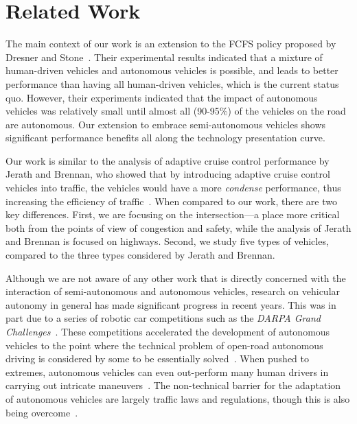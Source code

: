 \section{Related Work}

The main context of our work is an extension to the FCFS policy
proposed by Dresner and Stone~\cite{bib:Dresner08Multiagent}. Their
experimental results indicated that a mixture of human-driven vehicles
and autonomous vehicles is possible, and leads to better performance
than having all human-driven vehicles, which is the current status
quo.  However, their experiments indicated that the impact of
autonomous vehicles was relatively small until almost all (90-95\%) of
the vehicles on the road are autonomous.  Our extension to embrace
semi-autonomous vehicles shows significant performance benefits all
along the technology presentation curve.

Our work is similar to the analysis of adaptive cruise control
performance by Jerath and Brennan, who showed that by introducing
adaptive cruise control vehicles into traffic, the vehicles would have
a more \textit{condense} performance, thus increasing the efficiency
of traffic~\cite{bib:Jerath10adaptive}.  When compared to our work,
there are two key differences.  First, we are focusing on the
intersection---a place more critical both from the points of view of
congestion and safety, while the analysis of Jerath and Brennan is
focused on highways.  Second, we study five types of vehicles,
compared to the three types considered by Jerath and Brennan.

Although we are not aware of any other work that is directly concerned
with the interaction of semi-autonomous and autonomous vehicles,
research on vehicular autonomy in general has made significant
progress in recent years.  This was in part due to a series of robotic
car competitions such as the \emph{DARPA Grand
Challenges}~\cite{DARPAGrandChallenge}.  These competitions
accelerated the development of autonomous vehicles to the point where
the technical problem of open-road autonomous driving is considered by
some to be essentially solved~\cite{JAIR08-dresner}.  When pushed to
extremes, autonomous vehicles can even out-perform many human drivers
in carrying out intricate maneuvers~\cite{Squatriglia2010}. The
non-technical barrier for the adaptation of autonomous vehicles are
largely traffic laws and regulations, though this is also being
overcome~\cite{calo2011-nevada}.

